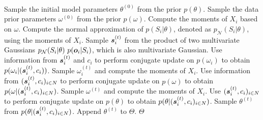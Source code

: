 \documentclass{article}
\theoremstyle{plain}
\theoremstyle{definition}
\theoremstyle{remark}
\begin{document}
\begin{algorithm}[ht]
	\caption{BLR Gibbs sampler \cite{bernstein2019blr} from noise-aware posterior $p(\theta|O_N = \vo_N)  \propto \int \prod_{i \in N}\left[p(\vo_i|\vs_i)\ p(\vs_i|\theta)\right]p(\theta) \ \,\text{d}\vs_1\dotsi\,\text{d}\vs_n$. The algorithm (repeatedly) sample the latent variables $S_i$, $\omega$ and $\theta$ sequentially. }\label{alg}
	\begin{algorithmic}[1]
	     \\ 
		\STATE Sample the initial model parameters $\theta^{(0)}$ from the prior $p(\theta)$.
		\STATE Sample the data prior parameters $\omega^{(0)}$ from the prior $p(\omega)$.
		\STATE Compute the moments of $X_i$ based on $\omega$.
		        \STATE Compute the normal approximation of $p(S_i|\theta)$, denoted as $p_{\mathcal{N}}(S_i|\theta)$, using the moments of $X_i$.
		        \STATE Sample ${\bm{s}}_i^{(t)}$ from the product of two multivariate Gaussians $p_{\mathcal{N}}(S_i|\theta)\  p({\bm{o}}_i |S_i)$, which is also multivariate Gaussian.
		          \STATE Use information from ${\bm{s}}_i^{(t)}$ and $c_i$ to perform conjugate update on $p(\omega_i)$ to obtain $p(\omega_i|({\bm{s}}_i^{(t)},c_i))$. Sample $\omega_i^{(t)}$ and compute the moments of $X_i$. \label{alg:indiv-prior}
                \ENDIF
		    \ENDFOR
            \STATE Use information from $({\bm{s}}_i^{(t)},c_i)_{i \in N}$ to perform conjugate update on $p(\omega)$ to obtain $p(\omega|({\bm{s}}_i^{(t)},c_i)_{i \in N})$. Sample $\omega^{(t)}$ and compute the moments of $X_i$.
            \ENDIF
		    \STATE Use $({\bm{s}}_i^{(t)},c_i)_{i \in N}$ to perform conjugate update on $p(\theta)$ to obtain $p(\theta|({\bm{s}}_i^{(t)},c_i)_{i \in N})$. 
		    \STATE Sample $\theta^{(t)}$ from $p(\theta|({\bm{s}}_i^{(t)},c_i)_{i \in N})$.
		        \STATE Append $\theta^{(t)}$ to ${\Theta}$.
    		\ENDIF
		\ENDFOR
		\RETURN  ${\Theta}$
	\end{algorithmic}
	\label{algo:gibbs}
\end{algorithm}
\end{document}
